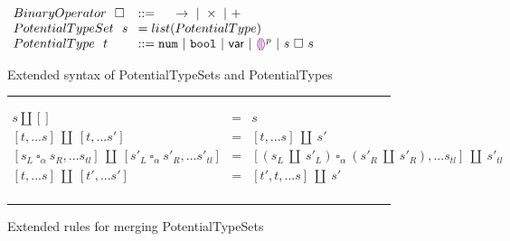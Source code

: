 \begin{figure}[h!]
\centering
\vspace{-3px} 
$\arraycolsep=4pt\begin{array}{lll}
BinaryOperator~~ \square & ::=~~~~~
\rightarrow  ~\vert~ 
\times  ~\vert~ 
+
\\
PotentialTypeSet~~ s & = list(PotentialType)
\\
PotentialType~~ t & ::= 
  \tnum ~\vert~
  \tbool ~\vert~
  \TVar ~\vert~
  \ehole^p ~\vert~
  s ~\square~ s
  \\
\end{array}$
\label{fig:syntax_possible_type_sets}
\caption{Extended syntax of PotentialTypeSets and PotentialTypes}
\hrule
\[\begin{array}{rcl}
    s \amalg [] & = & s \\
    \left[t,...s\right] ~\amalg~ \left[t,...s'\right] & = & \left[t,...s\right] ~\amalg~ s' \\
    \left[s_L ~ \square_{\alpha} ~ s_R,...s_{tl}\right] ~\amalg~ \left[s'_L ~ \square_{\alpha} ~ s'_R,...s'_{tl}\right] & = & \left[(s_L ~\amalg~ s'_L) ~ \square_{\alpha} ~ (s'_R ~\amalg~ s'_R),...s_{tl}\right] ~\amalg~ s'_{tl} \\
    \left[t,...s\right] ~\amalg~ \left[t',...s'\right] & = & \left[t',t,...s\right] ~\amalg~ s' \\

\end{array}\] 
\caption{Extended rules for merging PotentialTypeSets}
\vspace{5px} 
\hrule
\label{fig:extended_merging_possible_type_sets}
\vspace{-5px}
\end{figure}
